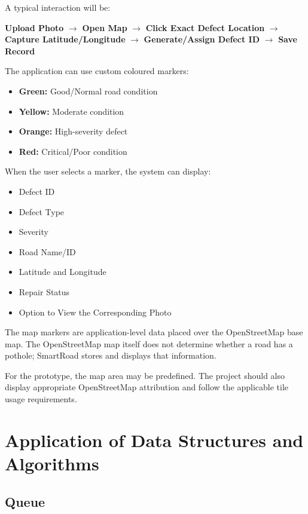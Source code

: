 \documentclass[12pt,a4paper]{article}
\begin{document}
A typical interaction will be:

\begin{center}
\textbf{Upload Photo}
$\rightarrow$
\textbf{Open Map}
$\rightarrow$
\textbf{Click Exact Defect Location}
$\rightarrow$
\textbf{Capture Latitude/Longitude}
$\rightarrow$
\textbf{Generate/Assign Defect ID}
$\rightarrow$
\textbf{Save Record}
\end{center}

The application can use custom coloured markers:
\begin{itemize}[leftmargin=*]
    \item \textbf{Green:} Good/Normal road condition
    \item \textbf{Yellow:} Moderate condition
    \item \textbf{Orange:} High-severity defect
    \item \textbf{Red:} Critical/Poor condition
\end{itemize}

When the user selects a marker, the system can display:
\begin{itemize}[leftmargin=*]
    \item Defect ID
    \item Defect Type
    \item Severity
    \item Road Name/ID
    \item Latitude and Longitude
    \item Repair Status
    \item Option to View the Corresponding Photo
\end{itemize}

The map markers are application-level data placed over the OpenStreetMap base map. The OpenStreetMap map itself does not determine whether a road has a pothole; SmartRoad stores and displays that information.

For the prototype, the map area may be predefined. The project should also display appropriate OpenStreetMap attribution and follow the applicable tile usage requirements.

\section{Application of Data Structures and Algorithms}

\subsection{Queue}
\end{document}
